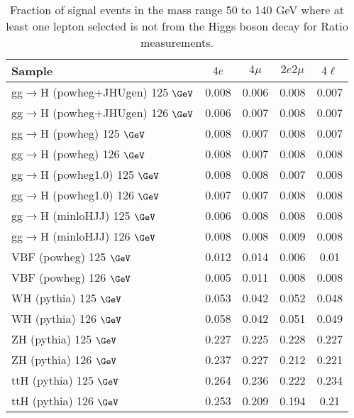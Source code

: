 \begin{table}[!h!tb]
\begin{center}
\small
\caption{
Fraction of signal events in the mass range 50 to 140 GeV where at least one lepton selected is not from the Higgs boson decay for Ratio measurements.
\label{tab:wrongracRatio}
}
\begin{tabular}{|l|c|c|c|c|} \hline
Sample & $4e$ & $4\mu$ & $2e2\mu$ & $4\ell$ \\ \hline
gg$\rightarrow$H ({\sc powheg+JHUgen}) 125 $\GeV$  & 0.008    & 0.006    & 0.008    & 0.007    \\
gg$\rightarrow$H ({\sc powheg+JHUgen}) 126 $\GeV$  & 0.006    & 0.007    & 0.008    & 0.007    \\
gg$\rightarrow$H ({\sc powheg}) 125 $\GeV$  & 0.008    & 0.007    & 0.008    & 0.007    \\
gg$\rightarrow$H ({\sc powheg}) 126 $\GeV$  & 0.008    & 0.007    & 0.008    & 0.008    \\
gg$\rightarrow$H ({\sc powheg1.0}) 125 $\GeV$  & 0.008    & 0.008    & 0.007    & 0.008    \\
gg$\rightarrow$H ({\sc powheg1.0}) 126 $\GeV$  & 0.007    & 0.007    & 0.008    & 0.008    \\
gg$\rightarrow$H ({\sc minloHJJ}) 125 $\GeV$  & 0.006    & 0.008    & 0.008    & 0.008    \\
gg$\rightarrow$H ({\sc minloHJJ}) 126 $\GeV$  & 0.008    & 0.008    & 0.009    & 0.008    \\
VBF ({\sc powheg}) 125 $\GeV$  & 0.012    & 0.014    & 0.006    & 0.01    \\
VBF ({\sc powheg}) 126 $\GeV$  & 0.005    & 0.011    & 0.008    & 0.008    \\
WH ({\sc pythia}) 125 $\GeV$  & 0.053    & 0.042    & 0.052    & 0.048    \\
WH ({\sc pythia}) 126 $\GeV$  & 0.058    & 0.042    & 0.051    & 0.049    \\
ZH ({\sc pythia}) 125 $\GeV$  & 0.227    & 0.225    & 0.228    & 0.227    \\
ZH ({\sc pythia}) 126 $\GeV$  & 0.237    & 0.227    & 0.212    & 0.221    \\
ttH ({\sc pythia}) 125 $\GeV$  & 0.264    & 0.236    & 0.222    & 0.234    \\
ttH ({\sc pythia}) 126 $\GeV$  & 0.253    & 0.209    & 0.194    & 0.21    \\
\hline
\end{tabular}
\normalsize
\end{center}
\end{table}




